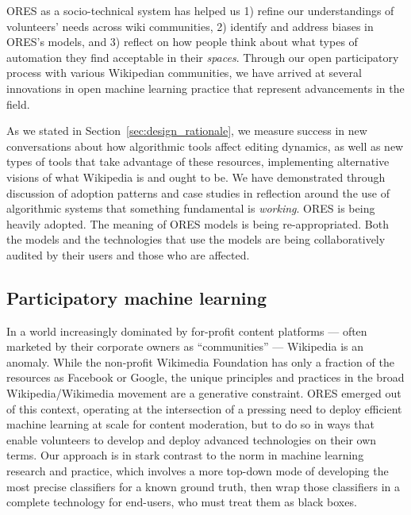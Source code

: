 ORES as a socio-technical system has helped us 1) refine our understandings of volunteers' needs across wiki communities, 2) identify and address biases in ORES's models, and 3) reflect on how people think about what types of automation they find acceptable in their \emph{spaces}.  Through our open participatory process with various Wikipedian communities, we have arrived at several innovations in open machine learning practice that represent advancements in the field.

As we stated in Section~\ref{sec:design_rationale}, we measure success in new conversations about how algorithmic tools affect editing dynamics, as well as new types of tools that take advantage of these resources, implementing alternative visions of what Wikipedia is and ought to be.  We have demonstrated through discussion of adoption patterns and case studies in reflection around the use of algorithmic systems that something fundamental is \emph{working}.  ORES is being heavily adopted.  The meaning of ORES models is being re-appropriated.  Both the models and the technologies that use the models are being collaboratively audited by their users and those who are affected.

\subsection{Participatory machine learning}
In a world increasingly dominated by for-profit content platforms --- often marketed by their corporate owners as ``communities'' \cite{gillespie2018custodians} --- Wikipedia is an anomaly. While the non-profit Wikimedia Foundation has only a fraction of the resources as Facebook or Google, the unique principles and practices in the broad Wikipedia/Wikimedia movement are a generative constraint. ORES emerged out of this context, operating at the intersection of a pressing need to deploy efficient machine learning at scale for content moderation, but to do so in ways that enable volunteers to develop and deploy advanced technologies on their own terms. Our approach is in stark contrast to the norm in machine learning research and practice, which involves a more top-down mode of developing the most precise classifiers for a known ground truth, then wrap those classifiers in a complete technology for end-users, who must treat them as black boxes.

